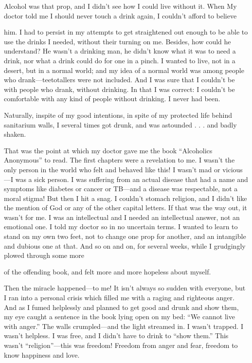 \begin{biblechapter}
Alcohol was that prop, and I didn’t see how I could live without it. When My doctor told me I should never touch a drink again, I couldn’t afford to believe

him. I had to persist in my attempts to get straightened out enough to be able to use the drinks I needed, without their turning on me. Besides, how could he understand? He wasn’t a drinking man, he didn’t know what it was to need a drink, nor what a drink could do for one in a pinch. I wanted to live, not in a desert, but in a normal world; and my idea of a normal world was among people who drank—teetotallers were not included. And I was sure that I couldn’t be with people who drank, without drinking. In that I was correct: I couldn’t be comfortable with any kind of people without drinking. I never had been.

Naturally, inspite of my good intentions, in spite of my protected life behind sanitarium walls, I several times got drunk, and was astounded . . . and badly shaken.

That was the point at which my doctor gave me the book “Alcoholics Anonymous” to read. The first chapters were a revelation to me. I wasn’t the only person in the world who felt and behaved like this! I wasn’t mad or vicious—I was a sick person. I was suffering from an actual disease that had a name and symptoms like diabetes or cancer or TB—and a disease was respectable, not a moral stigma! But then I hit a snag. I couldn’t stomach religion, and I didn’t like the mention of God or any of the other capital letters. If that was the way out, it wasn’t for me. I was an intellectual and I needed an intellectual answer, not an emotional one. I told my doctor so in no uncertain terms. I wanted to learn to stand on my own two feet, not to change one prop for another, and an intangible and dubious one at that. And so on and on, for several weeks, while I grudgingly plowed through some more

of the offending book, and felt more and more hopeless about myself.

Then the miracle happened—to me! It isn’t always so sudden with everyone, but I ran into a personal crisis which filled me with a raging and righteous anger. And as I fumed helplessly and planned to get good and drunk and show them, my eye caught a sentence in the book lying open on my bed: “We cannot live with anger.” The walls crumpled—and the light streamed in. I wasn’t trapped. I wasn’t helpless. I was free, and I didn’t have to drink to “show them.” This wasn’t “religion”—this was freedom! Freedom from anger and fear, freedom to know happiness and love.


\end{biblechapter}
